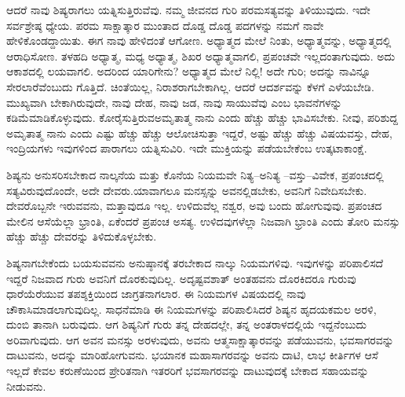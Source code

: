 ಆದರೆ ನಾವು ಶಿಷ್ಯರಾಗಲು ಯತ್ನಿಸುತ್ತಿರುವೆವು. ನಮ್ಮ ಜೀವನದ ಗುರಿ ಪರಮಸತ್ಯವನ್ನು ತಿಳಿಯುವುದು. ಇದೇ ಸರ್ವಶ್ರೇಷ್ಠ ಧ್ಯೇಯ. ಪರಮ ಸಾಕ್ಷಾತ್ಕಾರ ಮುಂತಾದ ದೊಡ್ಡ ದೊಡ್ಡ ಪದಗಳನ್ನು ನಮಗೆ ನಾವೇ ಹೇಳಿಕೊಂಡದ್ದಾಯಿತು. ಈಗ ನಾವು ಹೇಳಿದಂತೆ ಆಗೋಣ. ಅಧ್ಯಾತ್ಮದ ಮೇಲೆ ನಿಂತು, ಅಧ್ಯಾತ್ಮವನ್ನು, ಅಧ್ಯಾತ್ಮದಲ್ಲಿ ಆರಾಧಿಸೋಣ. ತಳಹದಿ ಅಧ್ಯಾತ್ಮ, ಮಧ್ಯ ಅಧ್ಯಾತ್ಮ, ಶಿಖರ ಅಧ್ಯಾತ್ಮವಾಗಲಿ, ಪ್ರಪಂಚವೇ ಇಲ್ಲದಂತಾಗುವುದು. ಅದು ಆಕಾಶದಲ್ಲಿ ಲಯವಾಗಲಿ. ಅದರಿಂದ ಯಾರಿಗೇನು? ಅಧ್ಯಾತ್ಮದ ಮೇಲೆ ನಿಲ್ಲಿ! ಅದೇ ಗುರಿ; ಅದನ್ನು ನಾವಿನ್ನೂ ಸೇರಲಾರೆವೆಂಬುದು ಗೊತ್ತಿದೆ. ಚಿಂತೆಯಿಲ್ಲ, ನಿರಾಶರಾಗಬೇಕಾಗಿಲ್ಲ. ಆದರೆ ಆದರ್ಶವನ್ನು ಕೆಳಗೆ ಎಳೆಯಬೇಡಿ. ಮುಖ್ಯವಾಗಿ ಬೇಕಾಗಿರುವುದೇ, ನಾವು ದೇಹ, ನಾವು ಜಡ, ನಾವು ಸಾಯುವೆವು ಎಂಬ ಭಾವನೆಗಳನ್ನು ಕಡಿಮೆಮಾಡಿಕೊಳ್ಳುವುದು. ಕೋರೈಸುತ್ತಿರುವ\break ಅಮೃತಾತ್ಮ ನಾನು ಎಂದು ಹೆಚ್ಚು ಹೆಚ್ಚು ಭಾವಿಸಬೇಕು. ನೀವು, ಪರಿಶುದ್ದ ಅಮೃತಾತ್ಮ ನಾನು ಎಂದು ಎಷ್ಟು ಹೆಚ್ಚು ಹೆಚ್ಚು ಆಲೋಚಿಸುತ್ತಾ ಇದ್ದರೆ, ಅಷ್ಟು ಹೆಚ್ಚು ಹೆಚ್ಚು ವಿಷಯವಸ್ತು, ದೇಹ, ಇಂದ್ರಿಯಗಳು ಇವುಗಳಿಂದ ಪಾರಾಗಲು ಯತ್ನಿಸುವಿರಿ. ಇದೇ ಮುಕ್ತಿಯನ್ನು ಪಡೆಯಬೇಕೆಂಬ ಉತ್ಕಟಾಕಾಂಕ್ಷೆ.

ಶಿಷ್ಯನು ಅನುಸರಿಸಬೇಕಾದ ನಾಲ್ಕನೆಯ ಮತ್ತು ಕೊನೆಯ ನಿಯಮವೇ ನಿತ್ಯ–ಅನಿತ್ಯ –ವಸ್ತು–ವಿವೇಕ, ಪ್ರಪಂಚದಲ್ಲಿ ಸತ್ಯವಿರುವುದೊಂದೇ, ಅದೇ ದೇವರು.\break ಯಾವಾಗಲೂ ಮನಸ್ಸನ್ನು ಅವನಲ್ಲಿಡಬೇಕು, ಅವನಿಗೆ ನಿವೇದಿಸಬೇಕು. ದೇವರೊಬ್ಬನೇ ಇರುವವನು, ಮತ್ತಾವುದೂ ಇಲ್ಲ. ಉಳಿದುವೆಲ್ಲ ನಶ್ವರ, ಅವು ಬಂದು ಹೋಗುವುವು. ಪ್ರಪಂಚದ ಮೇಲಿನ ಆಸೆಯೆಲ್ಲಾ ಭ್ರಾಂತಿ, ಏಕೆಂದರೆ ಪ್ರಪಂಚ ಅಸತ್ಯ. ಉಳಿದವುಗಳೆಲ್ಲಾ ನಿಜವಾಗಿ ಭ್ರಾಂತಿ ಎಂದು ತೋರಿ ಮನಸ್ಸು ಹೆಚ್ಚು ಹೆಚ್ಚು ದೇವರನ್ನು ತಿಳಿದುಕೊಳ್ಳಬೇಕು.

ಶಿಷ್ಯನಾಗಬೇಕೆಂದು ಬಯಸುವವನು ಅನುಷ್ಠಾನಕ್ಕೆ ತರಬೇಕಾದ ನಾಲ್ಕು ನಿಯಮಗಳಿವು. ಇವುಗಳನ್ನು ಪರಿಪಾಲಿಸದೆ ಇದ್ದರೆ ನಿಜವಾದ ಗುರು ಅವನಿಗೆ ದೊರಕುವುದಿಲ್ಲ. ಅದೃಷ್ಟವಶಾತ್ ಅಂತಹವನು ದೊರಕಿದರೂ ಗುರುವು ಧಾರೆಯೆರೆಯುವ ತಪಶ್ಶಕ್ತಿಯಿಂದ ಜಾಗ್ರತನಾಗಲಾರ. ಈ ನಿಯಮಗಳ ವಿಷಯದಲ್ಲಿ ನಾವು ಚೌಕಾಸಿಮಾಡಲಾಗುವುದಿಲ್ಲ. ಸಾಧನೆಮಾಡಿ ಈ ನಿಯಮಗಳನ್ನು ಪರಿಪಾಲಿಸಿದರೆ ಶಿಷ್ಯನ ಹೃದಯಕಮಲ ಅರಳಿ, ದುಂಬಿ ತಾನಾಗಿ ಬರುವುದು. ಆಗ ಶಿಷ್ಯನಿಗೆ ಗುರು ತನ್ನ ದೇಹದಲ್ಲೇ, ತನ್ನ ಅಂತರಾಳದಲ್ಲಿಯೆ ಇದ್ದನೆಂಬುದು ಅರಿವಾಗುವುದು. ಆಗ ಅವನ ಮನಸ್ಸು ಅರಳುವುದು, ಅವನು ಆತ್ಮಸಾಕ್ಷಾತ್ಕಾರವನ್ನು ಪಡೆಯುವನು, ಭವಸಾಗರವನ್ನು ದಾಟುವನು, ಅದನ್ನು ಮಾರಿಹೋಗುವನು. ಭಯಾನಕ ಮಹಾಸಾಗರವನ್ನು ಅವನು ದಾಟಿ, ಲಾಭ ಕೀರ್ತಿಗಳ ಆಸೆ ಇಲ್ಲದೆ ಕೇವಲ ಕರುಣೆಯಿಂದ ಪ್ರೇರಿತನಾಗಿ ಇತರರಿಗೆ ಭವಸಾಗರವನ್ನು ದಾಟುವುದಕ್ಕೆ ಬೇಕಾದ ಸಹಾಯವನ್ನು ನೀಡುವನು.

